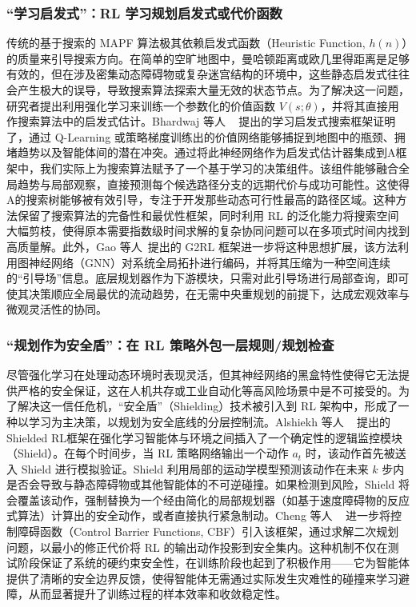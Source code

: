 \documentclass[13.5pt]{extarticle}
\begin{document}
\subsubsection{“学习启发式”：RL 学习规划启发式或代价函数}

传统的基于搜索的 MAPF 算法极其依赖启发式函数（Heuristic Function, $h(n)$）的质量来引导搜索方向。在简单的空旷地图中，曼哈顿距离或欧几里得距离是足够有效的，但在涉及密集动态障碍物或复杂迷宫结构的环境中，这些静态启发式往往会产生极大的误导，导致搜索算法探索大量无效的状态节点。为了解决这一问题，研究者提出利用强化学习来训练一个参数化的价值函数 $V(s; \theta)$，并将其直接用作搜索算法中的启发式估计。Bhardwaj 等人 ~\cite{bhardwaj2017learning} 提出的学习启发式搜索框架证明了，通过 Q-Learning 或策略梯度训练出的价值网络能够捕捉到地图中的瓶颈、拥堵趋势以及智能体间的潜在冲突。通过将此神经网络作为启发式估计器集成到A框架中，我们实际上为搜索算法赋予了一个基于学习的决策组件。该组件能够融合全局趋势与局部观察，直接预测每个候选路径分支的远期代价与成功可能性。这使得A的搜索树能够被有效引导，专注于开发那些动态可行性最高的路径区域。这种方法保留了搜索算法的完备性和最优性框架，同时利用 RL 的泛化能力将搜索空间大幅剪枝，使得原本需要指数级时间求解的复杂协同问题可以在多项式时间内找到高质量解。此外，Gao 等人~\cite{gao2020g2rl}提出的 G2RL 框架进一步将这种思想扩展，该方法利用图神经网络（GNN）对系统全局拓扑进行编码，并将其压缩为一种空间连续的“引导场”信息。底层规划器作为下游模块，只需对此引导场进行局部查询，即可使其决策顺应全局最优的流动趋势，在无需中央重规划的前提下，达成宏观效率与微观灵活性的协同。

\subsubsection{“规划作为安全盾”：在 RL 策略外包一层规则/规划检查}

尽管强化学习在处理动态环境时表现灵活，但其神经网络的黑盒特性使得它无法提供严格的安全保证，这在人机共存或工业自动化等高风险场景中是不可接受的。为了解决这一信任危机，“安全盾”（Shielding）技术被引入到 RL 架构中，形成了一种以学习为主决策，以规划为安全底线的分层控制流。Alshiekh 等人 ~\cite{alshiekh2018safe} 提出的Shielded RL框架在强化学习智能体与环境之间插入了一个确定性的逻辑监控模块（Shield）。在每个时间步，当 RL 策略网络输出一个动作 $a_t$ 时，该动作首先被送入 Shield 进行模拟验证。Shield 利用局部的运动学模型预测该动作在未来 $k$ 步内是否会导致与静态障碍物或其他智能体的不可逆碰撞。如果检测到风险，Shield 将会覆盖该动作，强制替换为一个经由简化的局部规划器（如基于速度障碍物的反应式算法）计算出的安全动作，或者直接执行紧急制动。Cheng 等人 ~\cite{cheng2019end} 进一步将控制障碍函数（Control Barrier Functions, CBF）引入该框架，通过求解二次规划问题，以最小的修正代价将 RL 的输出动作投影到安全集内。这种机制不仅在测试阶段保证了系统的硬约束安全性，在训练阶段也起到了积极作用——它为智能体提供了清晰的安全边界反馈，使得智能体无需通过实际发生灾难性的碰撞来学习避障，从而显著提升了训练过程的样本效率和收敛稳定性。
\end{document}
